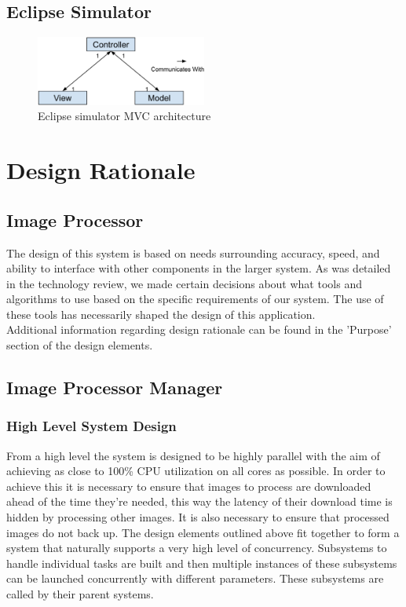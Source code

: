 \documentclass[10pt, onecolumn, draftclsnofoot, letterpaper, compsoc]{IEEEtran}
\begin{document}
\subsection{Eclipse Simulator}

\begin{figure}[H]
    \centering
    \includegraphics[width=0.5\textwidth]{jake_fig.eps}
    \caption{Eclipse simulator MVC architecture}
\end{figure}


\section{Design Rationale}

\subsection{Image Processor}

The design of this system is based on needs surrounding accuracy, speed, and
ability to interface with other components in the larger system. As was detailed
in the technology review, we made certain decisions about what tools and
algorithms to use based on the specific requirements of our system. The use of
these tools has necessarily shaped the design of this application.\\

Additional information regarding design rationale can be found in the 'Purpose'
section of the design elements.

\subsection{Image Processor Manager}

    \subsubsection{High Level System Design}
    From a high level the system is designed to be highly parallel with the aim of achieving as close to
    100\% CPU utilization on all cores as possible. In order to achieve this it is necessary to ensure that
    images to process are downloaded ahead of the time they're needed, this way the latency of their download
    time is hidden by processing other images. It is also necessary to ensure that processed images do not back
    up. The design elements outlined above fit together to form a system that naturally supports a very high
    level of concurrency. Subsystems to handle individual tasks are built and then multiple instances of these
    subsystems can be launched concurrently with different parameters. These subsystems are called by their
    parent systems. \\
\end{document}
